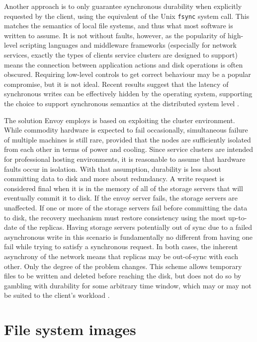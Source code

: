 Another approach is to only guarantee synchronous durability when explicitly requested by the client, using the equivalent of the Unix \texttt{fsync} system call. This matches the semantics of local file systems, and thus what most software is written to assume. It is not without faults, however, as the popularity of high-level scripting languages and middleware frameworks (especially for network services, exactly the types of clients service clusters are designed to support) means the connection between application actions and disk operations is often obscured. Requiring low-level controls to get correct behaviour may be a popular compromise, but it is not ideal. Recent results suggest that the latency of synchronous writes can be effectively hidden by the operating system, supporting the choice to support synchronous semantics at the distributed system level \cite{nightengale06}.

The solution Envoy employs is based on exploiting the cluster environment. While commodity hardware is expected to fail occasionally, simultaneous failure of multiple machines is still rare, provided that the nodes are sufficiently isolated from each other in terms of power and cooling. Since service clusters are intended for professional hosting environments, it is reasonable to assume that hardware faults occur in isolation. With that assumption, durability is less about committing data to disk and more about redundancy. A write request is considered final when it is in the memory of all of the storage servers that will eventually commit it to disk. If the envoy server fails, the storage servers are unaffected. If one or more of the storage servers fail before committing the data to disk, the recovery mechanism must restore consistency using the most up-to-date of the replicas. Having storage servers potentially out of sync due to a failed asynchronous write in this scenario is fundamentally no different from having one fail while trying to satisfy a synchronous request. In both cases, the inherent asynchrony of the network means that replicas may be out-of-sync with each other. Only the degree of the problem changes. This scheme allows temporary files to be written and deleted before reaching the disk, but does not do so by gambling with durability for some arbitrary time window, which may or may not be suited to the client's workload \cite{roselli}.

\section{File system images}

